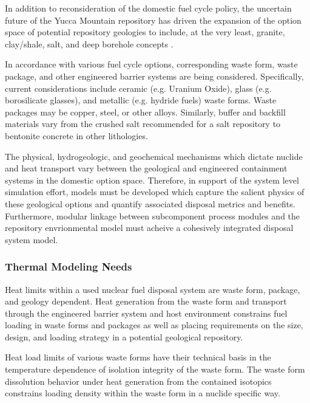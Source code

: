 In addition to reconsideration of the domestic fuel cycle policy, the 
uncertain future of the Yucca Mountain repository has driven the 
expansion of the option space of potential repository geologies to 
include, at the very least, granite, clay/shale, salt, and deep 
borehole concepts \cite{nutt_used_2010}. 

In accordance with various fuel cycle options, corresponding waste 
form, waste package, and other engineered barrier systems are being 
considered. Specifically, current considerations include ceramic (e.g.  
Uranium Oxide), glass (e.g.  borosilicate glasses), and metallic (e.g.  
hydride fuels) waste forms. Waste packages may be copper, steel, or 
other alloys. Similarly, buffer and backfill materials vary from the 
crushed salt recommended for a salt repository to bentonite concrete 
in other lithologies. %

The physical, hydrogeologic, and geochemical mechanisms which dictate 
nuclide and heat transport vary between the geological and engineered 
containment systems in the domestic option space.  Therefore, in 
support of the system level simulation effort, models must be 
developed which capture the salient physics of these geological 
options and quantify associated disposal metrics and benefits.  
Furthermore, modular linkage between subcomponent process modules and 
the repository envrionmental model must acheive a cohesively 
integrated disposal system model. 


\subsubsection{Thermal Modeling Needs}
Heat limits within a used nuclear fuel disposal system are waste form, 
package, and geology dependent. Heat generation from the waste form 
and transport through the engineered barrier system and host 
environment constrains fuel loading in waste forms and packages as 
well as placing requirements on the size, design, and loading strategy 
in a potential geological repository.

Heat load limits of various waste forms have their technical basis in 
the temperature dependence of isolation integrity of the waste form.  
The waste form dissolution behavior under heat generation from the 
contained isotopics constrains loading density within the waste form 
in a nuclide specific way.  

